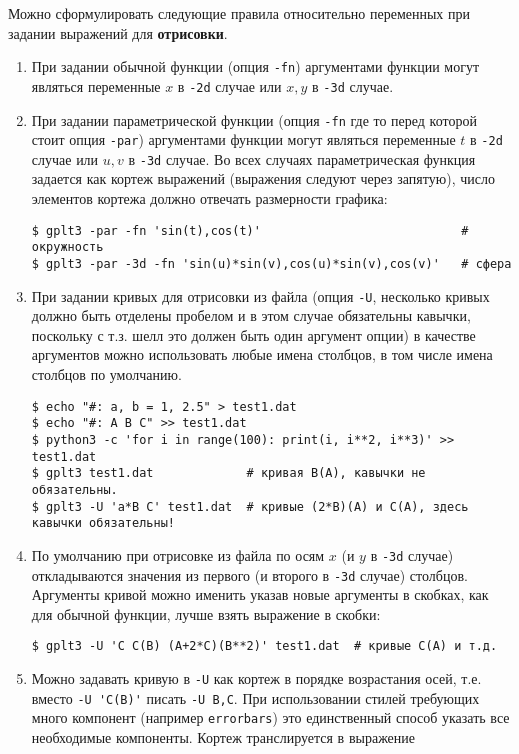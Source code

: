 \documentclass[12pt]{article}
\begin{document}
Можно сформулировать следующие правила относительно переменных при задании выражений для {\bf отрисовки}.
\begin{enumerate}
\item При задании обычной функции (опция \verb'-fn') аргументами функции могут являться переменные $x$ в \verb'-2d' случае или  $x, y$ в \verb'-3d' случае.
\item При задании параметрической функции (опция \verb'-fn' где то перед которой стоит опция \verb'-par')
  аргументами функции могут являться переменные $t$ в \verb'-2d' случае или  $u, v$ в \verb'-3d' случае. Во всех случаях параметрическая функция задается как
  кортеж выражений (выражения следуют через запятую), число элементов кортежа должно отвечать размерности графика:
\begin{verbatim}
$ gplt3 -par -fn 'sin(t),cos(t)'                            # окружность
$ gplt3 -par -3d -fn 'sin(u)*sin(v),cos(u)*sin(v),cos(v)'   # сфера
\end{verbatim}
\item При задании кривых для отрисовки из файла (опция \verb'-U', несколько кривых должно быть отделены пробелом и в этом случае обязательны кавычки, поскольку с т.з.
  шелл это должен быть один аргумент опции) в качестве аргументов можно использовать любые имена столбцов, в том числе имена столбцов по умолчанию.
\begin{verbatim}
$ echo "#: a, b = 1, 2.5" > test1.dat 
$ echo "#: A B C" >> test1.dat 
$ python3 -c 'for i in range(100): print(i, i**2, i**3)' >> test1.dat
$ gplt3 test1.dat             # кривая B(A), кавычки не обязательны.
$ gplt3 -U 'a*B C' test1.dat  # кривые (2*B)(A) и C(A), здесь кавычки обязательны!
\end{verbatim}
\item По умолчанию при отрисовке из файла по осям $x$ (и $y$ в \verb'-3d' случае) откладываются значения из первого (и второго в \verb'-3d' случае) столбцов.
  Аргументы кривой можно именить указав новые аргументы в скобках, как для обычной функции, лучше взять выражение в скобки:
\begin{verbatim}
$ gplt3 -U 'С C(B) (A+2*C)(B**2)' test1.dat  # кривые C(A) и т.д.
\end{verbatim}
\item Можно задавать кривую в \verb'-U' как кортеж в порядке возрастания осей, т.е. вместо \verb|-U 'C(B)'| писать \verb'-U B,C'. При использовании
  стилей требующих много компонент (например \verb'errorbars') это единственный способ указать все необходимые компоненты. Кортеж транслируется в выражение

\end{enumerate}
\end{document}

